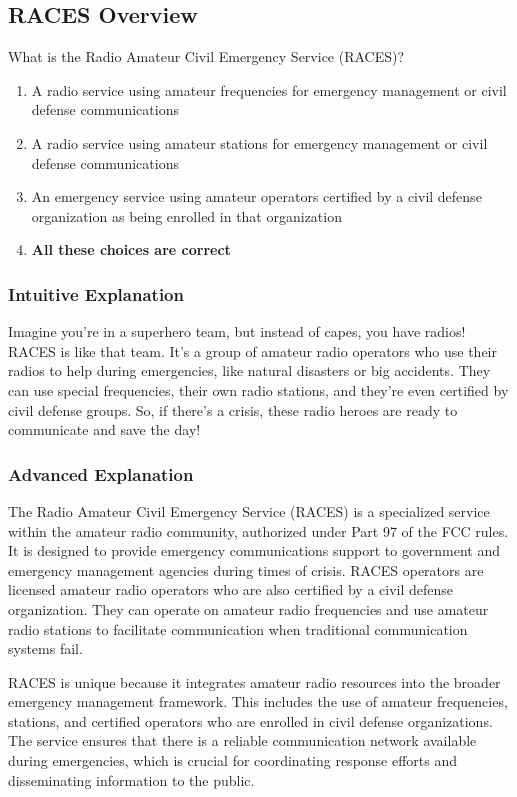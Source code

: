 \subsection{RACES Overview}
\label{T1A10}

\begin{tcolorbox}[colback=gray!10!white,colframe=black!75!black,title=T1A10]
What is the Radio Amateur Civil Emergency Service (RACES)?
\begin{enumerate}[label=\Alph*)]
    \item A radio service using amateur frequencies for emergency management or civil defense communications
    \item A radio service using amateur stations for emergency management or civil defense communications
    \item An emergency service using amateur operators certified by a civil defense organization as being enrolled in that organization
    \item \textbf{All these choices are correct}
\end{enumerate}
\end{tcolorbox}

\subsubsection{Intuitive Explanation}
Imagine you're in a superhero team, but instead of capes, you have radios! RACES is like that team. It’s a group of amateur radio operators who use their radios to help during emergencies, like natural disasters or big accidents. They can use special frequencies, their own radio stations, and they’re even certified by civil defense groups. So, if there’s a crisis, these radio heroes are ready to communicate and save the day!

\subsubsection{Advanced Explanation}
The Radio Amateur Civil Emergency Service (RACES) is a specialized service within the amateur radio community, authorized under Part 97 of the FCC rules. It is designed to provide emergency communications support to government and emergency management agencies during times of crisis. RACES operators are licensed amateur radio operators who are also certified by a civil defense organization. They can operate on amateur radio frequencies and use amateur radio stations to facilitate communication when traditional communication systems fail. 

RACES is unique because it integrates amateur radio resources into the broader emergency management framework. This includes the use of amateur frequencies, stations, and certified operators who are enrolled in civil defense organizations. The service ensures that there is a reliable communication network available during emergencies, which is crucial for coordinating response efforts and disseminating information to the public.

